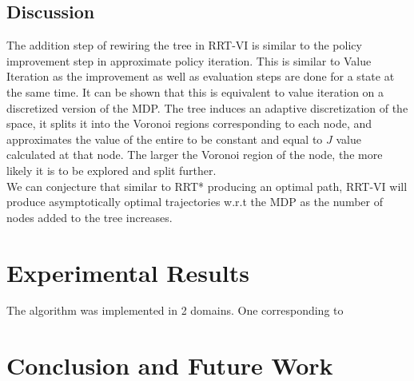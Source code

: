 \documentclass{article} %
\begin{document}
\subsection*{Discussion}
The addition step of rewiring the tree in RRT-VI is similar to the policy improvement step in approximate policy iteration. This is similar to Value Iteration as the improvement as well as evaluation steps are done for a state at the same time. It can be shown that this is equivalent to value iteration on a discretized version of the MDP. The tree induces an adaptive discretization of the space, it splits it into the Voronoi regions corresponding to each node, and approximates the value of the entire to be constant and equal to $J$ value calculated at that node. The larger the Voronoi region of the node, the more likely it is to be explored and split further.\\
We can conjecture that similar to RRT* producing an optimal path, RRT-VI will produce asymptotically optimal trajectories w.r.t the MDP as the number of nodes added to the tree increases.
\section{Experimental Results}
The algorithm was implemented in 2 domains. One corresponding to 

\section{Conclusion and Future Work}



\end{document}
